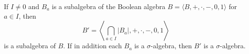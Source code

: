 If $I \neq 0$ and $B_a$ is a subalgebra of the Boolean algebra $B = \langle B, +, \cdot, -, 0, 1 \rangle$ for $a \in I$, then
$$
B' = \left\langle \bigcap_{a \in I} |B_a|, +, \cdot, -, 0, 1 \right\rangle
$$
is a subalgebra of $B$. If in addition each $B_a$ is a $\sigma$-algebra, then $B'$ is a $\sigma$-algebra.
